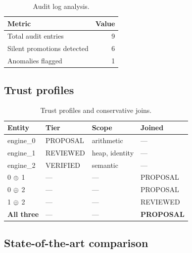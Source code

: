 \documentclass[11pt]{article}
\begin{document}
\begin{table}[t]
\centering
\caption{Audit log analysis.}
\label{tab:audit}
\begin{tabular}{@{}lr@{}}
\toprule
\textbf{Metric} & \textbf{Value} \\
\midrule
Total audit entries & 9 \\
Silent promotions detected & 6 \\
Anomalies flagged & 1 \\
\bottomrule
\end{tabular}
\end{table}

\subsection{Trust profiles}\label{sec:eval-profiles}

\begin{table}[t]
\centering
\caption{Trust profiles and conservative joins.}
\label{tab:profiles}
\begin{tabular}{@{}llll@{}}
\toprule
\textbf{Entity} & \textbf{Tier} & \textbf{Scope}
  & \textbf{Joined} \\
\midrule
engine\_0 & PROPOSAL & arithmetic & --- \\
engine\_1 & REVIEWED & heap, identity & --- \\
engine\_2 & VERIFIED & semantic & --- \\
\midrule
0 $\oplus$ 1 & --- & --- & PROPOSAL \\
0 $\oplus$ 2 & --- & --- & PROPOSAL \\
1 $\oplus$ 2 & --- & --- & REVIEWED \\
\midrule
\textbf{All three} & --- & --- & \textbf{PROPOSAL} \\
\bottomrule
\end{tabular}
\end{table}

\subsection{State-of-the-art comparison}\label{sec:eval-sota}
\end{document}
